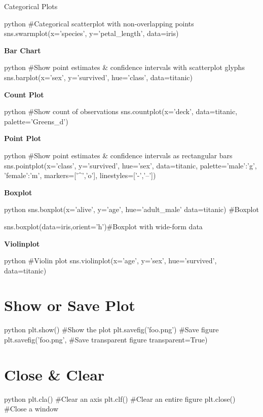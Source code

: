 \begin{myblock}{}
\begin{myblock}{Categorical Plots}
\begin{codebox}{python}{}
#Categorical scatterplot with non-overlapping points
sns.swarmplot(x='species',
              y='petal_length',
              data=iris)
\end{codebox}

\textbf{Bar Chart}
\begin{codebox}{python}{}
#Show point estimates & confidence intervals with scatterplot glyphs
sns.barplot(x='sex',
            y='survived',
            hue='class',
            data=titanic)
\end{codebox}

\textbf{Count Plot}
\begin{codebox}{python}{}
#Show count of observations
sns.countplot(x='deck',
              data=titanic,
              palette='Greens_d')
\end{codebox}

\textbf{Point Plot}
\begin{codebox}{python}{}
#Show point estimates & confidence intervals as rectangular bars
sns.pointplot(x='class',
              y='survived',
              hue='sex',
              data=titanic,
              palette={'male':'g',
                       'female':'m'},
              markers=['^','o'],
              linestyles=['-','--'])
\end{codebox}

\textbf{Boxplot}
\begin{codebox}{python}{}
sns.boxplot(x='alive',
            y='age',
            hue='adult_male'
            data=titanic)  #Boxplot

sns.boxplot(data=iris,orient='h')#Boxplot with wide-form data
\end{codebox}

\textbf{Violinplot}
\begin{codebox}{python}{}
#Violin plot
sns.violinplot(x='age',
               y='sex',
               hue='survived',
               data=titanic)
\end{codebox}

\end{myblock}
\end{myblock}

\section{Show or Save Plot}

\begin{codebox}{python}{}
plt.show()  #Show the plot
plt.savefig('foo.png')  #Save figure
plt.savefig('foo.png',  #Save transparent figure
            transparent=True)
\end{codebox}


\section{Close \& Clear}

\begin{codebox}{python}{}
plt.cla()  #Clear an axis
plt.clf()  #Clear an entire figure
plt.close()  #Close a window
\end{codebox}



